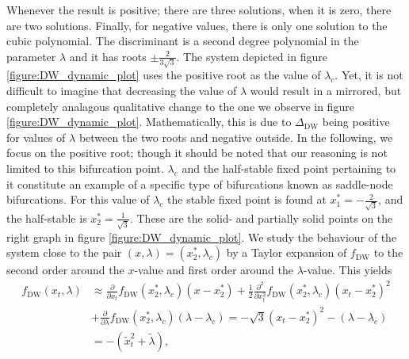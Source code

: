 Whenever the result is positive; there are three solutions, when it is zero, there are two solutions. Finally, for negative values, there is only one solution to the cubic polynomial. The discriminant is a second degree polynomial in the parameter $\lambda$ and it has roots $\pm \frac{2}{3\sqrt{3}}$. The system depicted in figure \ref{figure:DW_dynamic_plot} uses the positive root as the value of $\lambda_c$. Yet, it is not difficult to imagine that decreasing the value of $\lambda$ would result in a mirrored, but completely analagous qualitative change to the one we observe in figure \ref{figure:DW_dynamic_plot}. Mathematically, this is due to $\Delta_{\mathrm{DW}}$ being positive for values of $\lambda$ between the two roots and negative outside. In the following, we focus on the positive root; though it should be noted that our reasoning is not limited to this bifurcation point. $\lambda_c$ and the half-stable fixed point pertaining to it constitute an example of a specific type of bifurcations known as saddle-node bifurcations. For this value of $\lambda_c$ the stable fixed point is found at $x_1^* = -\frac{2}{\sqrt{3}}$, and the half-stable is $x_2^* = \frac{1}{\sqrt{3}}$. These are the solid- and partially solid points on the right graph in figure \ref{figure:DW_dynamic_plot}. We study the behaviour of the system close to the pair $(x, \lambda) = (x_2^*, \lambda_c)$ by a Taylor expansion of $f_{\mathrm{DW}}$ to the second order around the $x$-value and first order around the $\lambda$-value. This yields
\begin{align}
    f_{\mathrm{DW}}(x_t,\lambda)&\approx \frac{\partial}{\partial x_t}f_{\mathrm{DW}}(x_2^*,\lambda_c)(x-x_2^*) + \frac{1}{2}\frac{\partial^2}{\partial x_t^2}f_{\mathrm{DW}}(x_2^*,\lambda_c)(x_t-x_2^*)^2 \nonumber \\
     &+ \frac{\partial}{\partial \lambda}f_{\mathrm{DW}}(x_2^*,\lambda_c)(\lambda - \lambda_c) = -\sqrt{3}\left(x_t-x_2^*\right)^2 - \left(\lambda - \lambda_c\right) \nonumber \\&= -\left(\tilde{x}_t^2 + \tilde{\lambda}\right), \label{eq:prototypicalSaddleNode}
\end{align}
